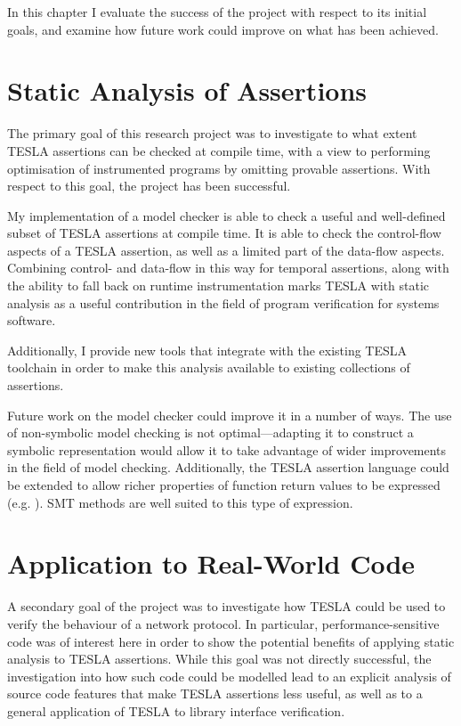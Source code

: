 In this chapter I evaluate the success of the project with respect to its
initial goals, and examine how future work could improve on what has been
achieved.

\section{Static Analysis of Assertions}

The primary goal of this research project was to investigate to what extent
TESLA assertions can be checked at compile time, with a view to performing
optimisation of instrumented programs by omitting provable assertions. With
respect to this goal, the project has been successful.

My implementation of a model checker is able to check a useful and well-defined
subset of TESLA assertions at compile time. It is able to check the control-flow
aspects of a TESLA assertion, as well as a limited part of the data-flow
aspects. Combining control- and data-flow in this way for temporal assertions,
along with the ability to fall back on runtime instrumentation marks TESLA with
static analysis as a useful contribution in the field of program verification
for systems software.

Additionally, I provide new tools that integrate with the existing TESLA
toolchain in order to make this analysis available to existing collections of
assertions.

Future work on the model checker could improve it in a number of ways. The use
of non-symbolic model checking is not optimal---adapting it to construct a
symbolic representation would allow it to take advantage of wider improvements
in the field of model checking. Additionally, the TESLA assertion language could
be extended to allow richer properties of function return values to be expressed
(e.g. ). SMT methods are well suited to this type of expression.

\section{Application to Real-World Code}

A secondary goal of the project was to investigate how TESLA could be used to
verify the behaviour of a network protocol. In particular, performance-sensitive
code was of interest here in order to show the potential benefits of applying
static analysis to TESLA assertions. While this goal was not directly
successful, the investigation into how such code could be modelled lead to an
explicit analysis of source code features that make TESLA assertions less
useful, as well as to a general application of TESLA to library interface
verification.

